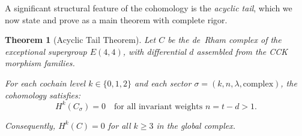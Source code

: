\documentclass[reqno,10pt]{amsart}
\theoremstyle{plain}
\newtheorem{theorem}{Theorem}[section]
\theoremstyle{definition}
\begin{document}
A significant structural feature of the cohomology is the \emph{acyclic tail}, 
which we now state and prove as a main theorem with complete rigor.

\begin{theorem}[Acyclic Tail Theorem]
\label{thm:acyclic-tail}
  Let $C$ be the de~Rham complex of the exceptional supergroup $E(4,4)$, 
  with differential $d$ assembled from the CCK morphism families. 
  
  For each cochain level $k \in \{0,1,2\}$ and each sector $\sigma = (k, n, \lambda, \text{complex})$, 
  the cohomology satisfies:
  \[
    H^k(C_\sigma) = 0 \quad \text{for all invariant weights } n = t - d > 1.
  \]
  
  Consequently, $H^k(C) = 0$ for all $k \geq 3$ in the global complex.
\end{theorem}
\end{document}
